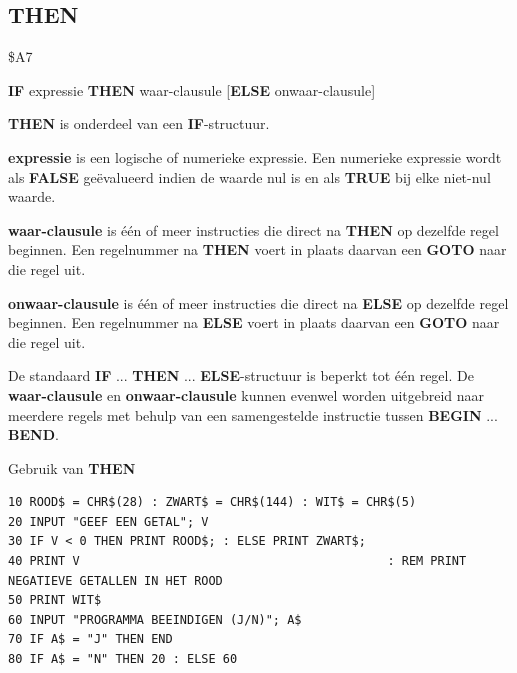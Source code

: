 \subsection{THEN}
\begin{description}[leftmargin=2cm,style=nextline]
\item [Token:]    \$A7

\item [Formaat:]   {\bf IF} expressie {\bf THEN} waar-clausule [{\bf ELSE} onwaar-clausule]

\item [Gebruik:]    {\bf THEN} is onderdeel van een {\bf IF}-structuur.

                  {\bf expressie} is een logische of numerieke expressie. Een numerieke expressie wordt als {\bf FALSE} geëvalueerd indien de waarde nul is en als {\bf TRUE} bij elke niet-nul waarde.

                  {\bf waar-clausule} is één of meer instructies die direct na {\bf THEN} op dezelfde regel beginnen. Een regelnummer na {\bf THEN} voert in plaats daarvan een {\bf GOTO} naar die regel uit.

                  {\bf onwaar-clausule} is één of meer instructies die direct na {\bf ELSE} op dezelfde regel beginnen. Een regelnummer na {\bf ELSE} voert in plaats daarvan een {\bf GOTO} naar die regel uit.

\item [Opmerkingen:]  De standaard {\bf IF} ... {\bf THEN} ... {\bf ELSE}-structuur is beperkt tot één regel. De {\bf waar-clausule} en {\bf onwaar-clausule} kunnen evenwel worden uitgebreid naar meerdere regels met behulp van een samengestelde instructie tussen {\bf BEGIN} ... {\bf BEND}.

\item [Voorbeeld:]  Gebruik van {\bf THEN}

\begin{tcolorbox}[colback=black,coltext=white]
\verbatimfont{\codefont}
\begin{verbatim}
10 ROOD$ = CHR$(28) : ZWART$ = CHR$(144) : WIT$ = CHR$(5)
20 INPUT "GEEF EEN GETAL"; V
30 IF V < 0 THEN PRINT ROOD$; : ELSE PRINT ZWART$;
40 PRINT V                                           : REM PRINT NEGATIEVE GETALLEN IN HET ROOD
50 PRINT WIT$
60 INPUT "PROGRAMMA BEEINDIGEN (J/N)"; A$
70 IF A$ = "J" THEN END
80 IF A$ = "N" THEN 20 : ELSE 60
\end{verbatim}
\end{tcolorbox}
\end{description}

